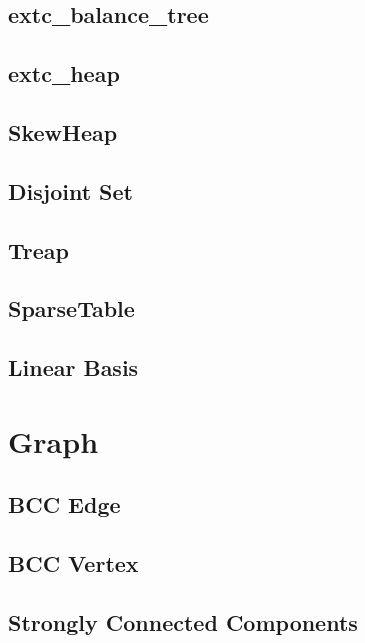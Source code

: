 \documentclass[a4paper,10pt,twocolumn,oneside]{article}
\begin{document}
\subsection{extc\_balance\_tree}

\subsection{extc\_heap}

\subsection{SkewHeap}

\subsection{Disjoint Set}

\subsection{Treap}

\subsection{SparseTable}

\subsection{Linear Basis}


\section{Graph}
\subsection{BCC Edge}

\subsection{BCC Vertex}

\subsection{Strongly Connected Components}

\end{document}
